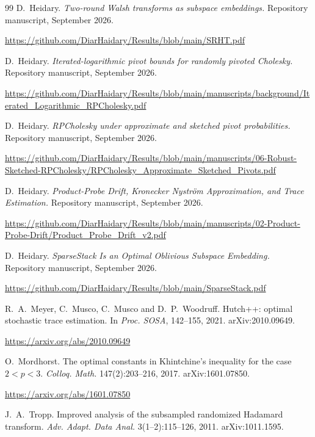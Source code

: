 \documentclass[11pt,a4paper]{article}
\theoremstyle{definition}
\theoremstyle{remark}
\numberwithin{equation}{section}
\begin{document}
\begin{thebibliography}{99}
D.~Heidary.
\newblock \emph{Two-round Walsh transforms as subspace embeddings.}
\newblock Repository manuscript, September 2026.

\newblock \url{https://github.com/DiarHaidary/Results/blob/main/SRHT.pdf}

D.~Heidary.
\newblock \emph{Iterated-logarithmic pivot bounds for randomly pivoted Cholesky.}
\newblock Repository manuscript, September 2026.

\newblock \url{https://github.com/DiarHaidary/Results/blob/main/manuscripts/background/Iterated_Logarithmic_RPCholesky.pdf}

D.~Heidary.
\newblock \emph{RPCholesky under approximate and sketched pivot probabilities.}
\newblock Repository manuscript, September 2026.

\newblock \url{https://github.com/DiarHaidary/Results/blob/main/manuscripts/06-Robust-Sketched-RPCholesky/RPCholesky_Approximate_Sketched_Pivots.pdf}

D.~Heidary.
\newblock \emph{Product-Probe Drift, Kronecker Nystr\"om Approximation, and Trace Estimation.}
\newblock Repository manuscript, September 2026.

\newblock \url{https://github.com/DiarHaidary/Results/blob/main/manuscripts/02-Product-Probe-Drift/Product_Probe_Drift_v2.pdf}

D.~Heidary.
\newblock \emph{SparseStack Is an Optimal Oblivious Subspace Embedding.}
\newblock Repository manuscript, September 2026.

\newblock \url{https://github.com/DiarHaidary/Results/blob/main/SparseStack.pdf}

R.~A.~Meyer, C.~Musco, C.~Musco and D.~P.~Woodruff.
\newblock Hutch++: optimal stochastic trace estimation.
\newblock In \emph{Proc. SOSA}, 142--155, 2021. arXiv:2010.09649.

\newblock \url{https://arxiv.org/abs/2010.09649}

O.~Mordhorst.
\newblock The optimal constants in Khintchine's inequality for the case $2<p<3$.
\newblock \emph{Colloq. Math.} 147(2):203--216, 2017. arXiv:1601.07850.

\newblock \url{https://arxiv.org/abs/1601.07850}

J.~A.~Tropp.
\newblock Improved analysis of the subsampled randomized Hadamard transform.
\newblock \emph{Adv. Adapt. Data Anal.} 3(1--2):115--126, 2011. arXiv:1011.1595.


\end{thebibliography}
\end{document}
